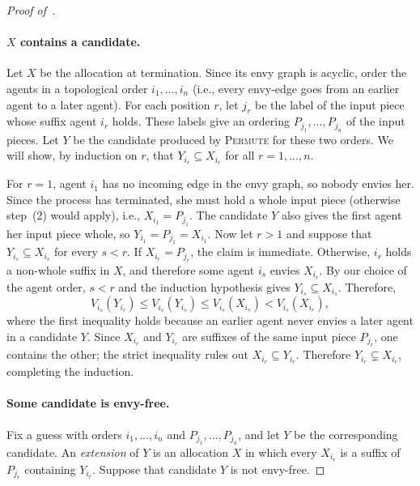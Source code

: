 \documentclass[11pt]{article}
\newcommand{\Permute}{\textsc{Permute}}
\theoremstyle{plain}
\theoremstyle{definition}
\theoremstyle{plain}
\begin{document}
\begin{proof}[Proof of~]
\paragraph{$X$ contains a candidate.}
Let $X$ be the allocation at termination. Since its envy graph is acyclic, order the agents in a topological order $i_1,\dots,i_n$ (i.e., every envy-edge goes from an earlier agent to a later agent). For each position $r$, let $j_r$ be the label of the input piece whose suffix agent $i_r$ holds. These labels give an ordering $P_{j_1},\dots,P_{j_n}$ of the input pieces. Let $Y$ be the candidate produced by \Permute{} for these two orders. We will show, by induction on $r$, that $Y_{i_r}\subseteq X_{i_r}$ for all $r = 1, \dots, n$.

For $r=1$, agent $i_1$ has no incoming edge in the envy graph, so nobody envies her. Since the process has terminated, she must hold a whole input piece (otherwise step~(2) would apply), i.e., $X_{i_1}=P_{j_1}$. The candidate $Y$ also gives the first agent her input piece whole, so $Y_{i_1}=P_{j_1}=X_{i_1}$.
Now let $r>1$ and suppose that $Y_{i_s}\subseteq X_{i_s}$ for every $s<r$.  If $X_{i_r}=P_{j_r}$, the claim is immediate. Otherwise, $i_r$ holds a non-whole suffix in $X$, and therefore some agent $i_s$ envies $X_{i_r}$. By our choice of the agent order, $s<r$ and the induction hypothesis gives $Y_{i_s}\subseteq X_{i_s}$. Therefore,
\[
V_{i_s}(Y_{i_r})
\le V_{i_s}(Y_{i_s})
\le V_{i_s}(X_{i_s})
< V_{i_s}(X_{i_r}),
\]
where the first inequality holds because an earlier agent never envies a later agent in a candidate $Y$. Since $X_{i_r}$ and $Y_{i_r}$ are suffixes of the same input piece $P_{j_r}$, one contains the other; the strict inequality rules out $X_{i_r}\subseteq Y_{i_r}$. Therefore $Y_{i_r}\subsetneq X_{i_r}$, completing the induction.


\paragraph{Some candidate is envy-free.}
Fix a guess with orders $i_1,\dots,i_n$ and $P_{j_1},\dots,P_{j_n}$, and let $Y$ be the corresponding candidate.  An \emph{extension} of $Y$ is an allocation $X$ in which every $X_{i_r}$ is a suffix of $P_{j_r}$ containing $Y_{i_r}$. Suppose that candidate $Y$ is not envy-free. 



\end{proof}
\end{document}
